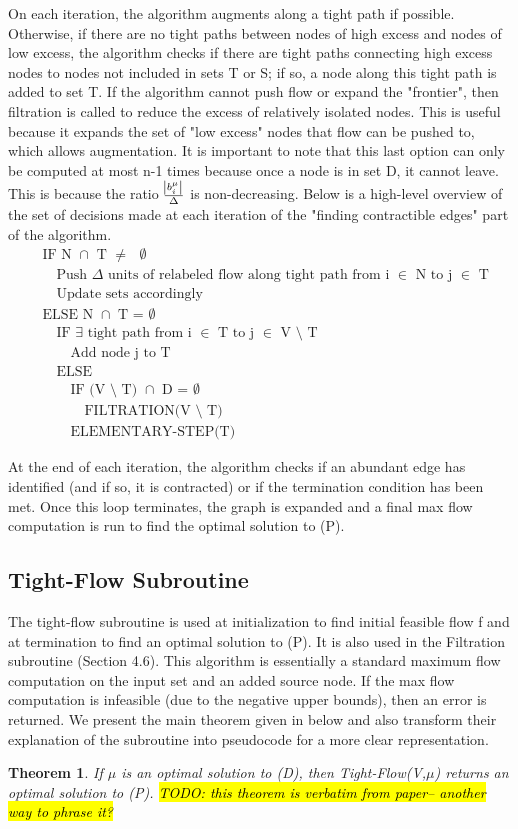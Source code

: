 \documentclass[11pt]{article}
\newtheorem{theorem}{Theorem}[section]
\theoremstyle{definition}
\theoremstyle{definition}
\newcommand{\todo}[1]{\hl{TODO: #1}}
\begin{document}
	On each iteration, the algorithm augments along a tight path if possible. Otherwise, if there are no tight paths between nodes of high excess and nodes of low excess, the algorithm checks if there are tight paths connecting high excess nodes to nodes not included in sets T or S; if so, a node along this tight path is added to set T. If the algorithm cannot push flow or expand the "frontier", then filtration is called to reduce the excess of relatively isolated nodes. This is useful because it expands the set of "low excess" nodes that flow can be pushed to, which allows augmentation. It is important to note that this last option can only be computed at most n-1 times because once a node is in set D, it cannot leave. This is because the ratio $\frac{\abs{b_i^\mu}}{\Delta}$ is non-decreasing. Below is a high-level overview of the set of decisions made at each iteration of the "finding contractible edges" part of the algorithm.
	\begin{align*}
	&\text{IF N $\cap$ T $\neq$ $\emptyset$} \\
	&\quad \text{Push $\Delta$ units of relabeled flow along tight path from i $\in$ N to j $\in$ T} \\ 
	&\quad \text{Update sets accordingly} \\
	&\text{ELSE N $\cap$ T = $\emptyset$} \\
	&\quad \text{IF $\exists$ tight path from i $\in$ T to j $\in$ V $\setminus$ T} \\
	&\quad \quad \text{Add node j to T} \\
	&\quad \text{ELSE} \\
	&\quad \quad \text{IF (V $\setminus$ T) $\cap$ D = $\emptyset$} \\
	&\quad \quad \quad \text{FILTRATION(V $\setminus$ T)} \\
	&\quad \quad \text{ELEMENTARY-STEP(T)} 
	\end{align*}
	
	At the end of each iteration, the algorithm checks if an abundant edge has identified (and if so, it is contracted) or if the termination condition has been met. Once this loop terminates, the graph is expanded and a final max flow computation is run to find the optimal solution to (P).
	\subsection{Tight-Flow Subroutine}
	The tight-flow subroutine is used at initialization to find initial feasible flow f and at termination to find an optimal solution to (P). It is also used in the Filtration subroutine (Section 4.6). This algorithm is essentially a standard maximum flow computation on the input set and an added source node. If the max flow computation is infeasible (due to the negative upper bounds), then an error is returned. We present the main theorem given in \cite{Vegh2013} below and also transform their explanation of the subroutine into pseudocode for a more clear representation.
	\begin{theorem}
	If $\mu$ is an optimal solution to (D), then Tight-Flow(V,$\mu$) returns an optimal solution to (P). \todo{this theorem is verbatim from paper-- another way to phrase it?}
	\end{theorem}
	
\end{document}
